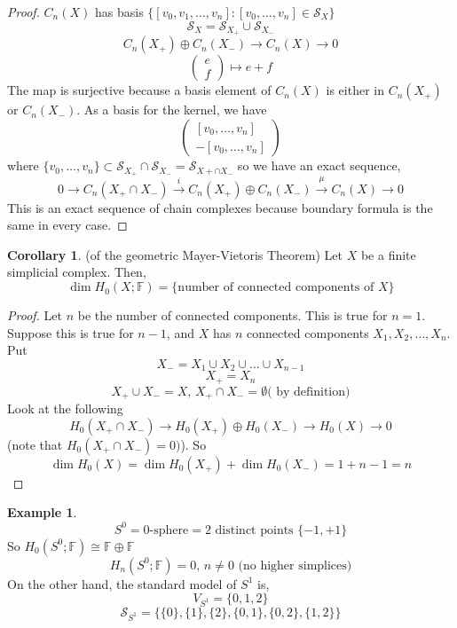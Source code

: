 \documentclass[a4paper,14pt]{extarticle}
\theoremstyle{definition}
\newtheorem*{corollary}{Corollary}
\newtheorem*{eg}{Example}
\begin{document}
\begin{proof}
	$C_n(X)$ has basis
	$\{[v_0,v_1,\ldots,v_n]:[v_0,\ldots,v_n]\in\mathcal{S}_X\}$
	\[\mathcal{S}_X=\mathcal{S}_{X_+}\cup \mathcal{S}_{X_-}\]
	\[C_n(X_+)\oplus C_n(X_-)\rightarrow C_n(X)\rightarrow 0\]
	\[\begin{pmatrix}
		e \\ f
	\end{pmatrix}\mapsto e+f\]
	The map is surjective because a basis element of $C_n(X)$ is either in 
	$C_n(X_+)$ or $C_n(X_-)$. As a basis for the kernel, we have
	\[\begin{pmatrix}
		[v_0,\ldots,v_n] \\ -[v_0,\ldots,v_n]
	\end{pmatrix}\] where $\{v_0,\ldots,v_n\}\subset
	\mathcal{S}_{X_+}\cap \mathcal{S}_{X_-}= \mathcal{S}_{X+\cap X_-}$
	so we have an exact sequence,
	\[0\rightarrow C_n(X_+\cap X_-)\xrightarrow{i} C_n(X_+)\oplus C_n(X_-)
	\xrightarrow{\mu} C_n(X)\rightarrow 0\]
	This is an exact sequence of chain complexes because boundary formula is 
	the same in every case.
\end{proof}

\begin{corollary}
	{(of the geometric Mayer-Vietoris Theorem)}
	Let $X$ be a finite simplicial complex. Then,
	\[\dim H_0(X;\mathbb{F})=\{\text{number of connected components of $X$}\}\]
\end{corollary}

\begin{proof}
	Let $n$ be the number of connected components. This is true for $n=1$.
	Suppose this is true for $n-1$, and $X$ has $n$ connected components
	$X_1,X_2,\ldots, X_n$. Put \[X_-=X_1\cup X_2\cup\ldots\cup X_{n-1}\]
	\[X_+=X_n\] \[X_+\cup X_-=X, \,X_+\cap X_-=\emptyset
	\text{( by definition)}\]
	Look at the following
	\[H_0(X_+\cap X_-)\rightarrow H_0(X_+)\oplus H_0(X_-)\rightarrow H_0(X)
	\rightarrow 0\] (note that $H_0(X_+\cap X_-)=0)$). So 
	\[\dim H_0(X)=\dim H_0(X_+)+\dim H_0(X_-) = 1 + n-1 = n\]
\end{proof}

\begin{eg}
	\[S^0=0\text{-sphere}=2\text{ distinct points }\{-1,+1\}\]
	So $H_0(S^0;\mathbb{F})\cong \mathbb{F}\oplus \mathbb{F}$
	\[H_n(S^0;\mathbb{F})=0, \,n\neq0\text{ (no higher simplices)}\]
	On the other hand, the standard model of $S^1$ is,
	\[V_{S^1}=\{0,1,2\}\]
	\[\mathcal{S}_{S^1}=\{\{0\},\{1\},\{2\},\{0,1\},\{0,2\},\{1,2\}\}\]
\end{eg}
\end{document}
